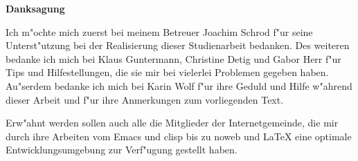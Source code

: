 

\mbox{}
\vfill

\noindent\textbf{Danksagung}

\bigskip

\noindent Ich m"ochte mich zuerst bei meinem Betreuer Joachim Schrod
f"ur seine Unterst"utzung bei der Realisierung dieser Studienarbeit
bedanken. Des weiteren bedanke ich mich bei Klaus Guntermann,
Christine Detig und Gabor Herr f"ur Tips und Hilfestellungen, die sie
mir bei vielerlei Problemen gegeben haben. Au"serdem bedanke ich mich
bei Karin Wolf f"ur ihre Geduld und Hilfe w"ahrend dieser Arbeit und
f"ur ihre Anmerkungen zum vorliegenden Text.

\bigskip\noindent Erw"ahnt werden sollen auch alle die Mitglieder der
Internetgemeinde, die mir durch ihre Arbeiten vom \textsf{Emacs} und
\textsf{clisp} bis zu \textsf{noweb} und \LaTeX{} eine optimale
Entwicklungsumgebung zur Verf"ugung gestellt haben.

